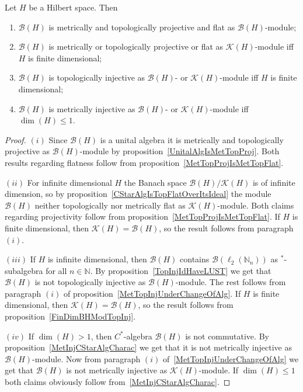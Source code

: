 \begin{proposition}\label{KHAndBHModBH} Let $H$ be a Hilbert space. Then

\begin{enumerate}[label = (\roman*)]
    \item $\mathcal{B}(H)$ is metrically and topologically projective and 
    flat as $\mathcal{B}(H)$-module;

    \item $\mathcal{B}(H)$ is metrically or topologically projective or flat as
    $\mathcal{K}(H)$-module iff $H$ is finite dimensional;

    \item $\mathcal{B}(H)$ is topologically injective as $\mathcal{B}(H)$- or
    $\mathcal{K}(H)$-module iff $H$ is finite dimensional;

    \item $\mathcal{B}(H)$ is metrically injective as $\mathcal{B}(H)$- or
    $\mathcal{K}(H)$-module iff $\dim(H)\leq 1$.
\end{enumerate}
\end{proposition}
\begin{proof} $(i)$ Since $\mathcal{B}(H)$ is a unital algebra it is metrically
and topologically projective as $\mathcal{B}(H)$-module by
proposition~\ref{UnitalAlgIsMetTopProj}. Both results regarding flatness follow
from proposition~\ref{MetTopProjIsMetTopFlat}.

$(ii)$ For infinite dimensional $H$ the Banach space
$\mathcal{B}(H)/\mathcal{K}(H)$ is of infinite dimension, so by
proposition~\ref{CStarAlgIsTopFlatOverItsIdeal} the module $\mathcal{B}(H)$
neither topologically nor metrically flat as $\mathcal{K}(H)$-module. Both
claims regarding projectivity follow from
proposition~\ref{MetTopProjIsMetTopFlat}. If $H$ is finite dimensional, then
$\mathcal{K}(H)=\mathcal{B}(H)$, so the result follows from paragraph $(i)$.

$(iii)$ If $H$ is infinite dimensional, then $\mathcal{B}(H)$ contains
$\mathcal{B}(\ell_2(\mathbb{N}_n))$ as ${}^*$-subalgebra for all
$n\in\mathbb{N}$. By proposition~\ref{TopInjIdHaveLUST} we get that
$\mathcal{B}(H)$ is not topologically injective as $\mathcal{B}(H)$-module. The
rest follows from paragraph $(i)$ of
proposition~\ref{MetTopInjUnderChangeOfAlg}. If $H$ is finite dimensional, then
$\mathcal{K}(H)=\mathcal{B}(H)$, so the result follows from
proposition~\ref{FinDimBHModTopInj}.

$(iv)$ If $\dim(H)>1$, then $C^*$-algebra $\mathcal{B}(H)$ is not commutative. 
By proposition~\ref{MetInjCStarAlgCharac} we get that it is not metrically
injective as $\mathcal{B}(H)$-module. Now from paragraph $(i)$
of~\ref{MetTopInjUnderChangeOfAlg} we get that $\mathcal{B}(H)$ is not
metrically injective as $\mathcal{K}(H)$-module. If $\dim(H)\leq 1$ both claims
obviously follow from~\ref{MetInjCStarAlgCharac}.
\end{proof}

